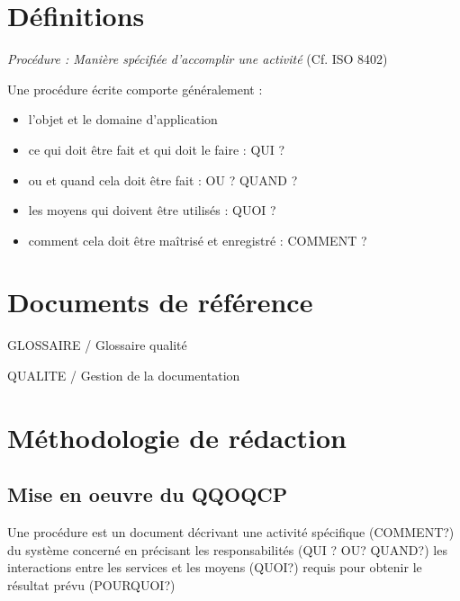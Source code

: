 \documentclass{mise_en_page}
\begin{document}
\maketitle

\begin{historique}
\end{historique}

\newpage

\tableofcontents

\section{Définitions}
\emph{Procédure : Manière spécifiée d’accomplir une activité} (Cf. ISO 8402)

Une procédure écrite comporte généralement :

\begin{itemize}
\item l’objet et  le domaine d’application
\item ce qui doit être fait et qui doit le faire : QUI ?
\item ou et quand cela doit être fait : OU ? QUAND ?
\item les moyens qui doivent être utilisés : QUOI ?
\item comment cela doit  être maîtrisé et  enregistré : COMMENT ?
\end{itemize}

\section{Documents de référence}

GLOSSAIRE / Glossaire qualité

QUALITE / Gestion de la documentation


\section{Méthodologie de rédaction}
\subsection{Mise en oeuvre du QQOQCP}
Une procédure est un document décrivant une activité spécifique
(COMMENT?) du système concerné en précisant les responsabilités (QUI ?
OU? QUAND?)  les interactions entre les services et les moyens (QUOI?)
requis pour obtenir le résultat prévu (POURQUOI?)
\end{document}
